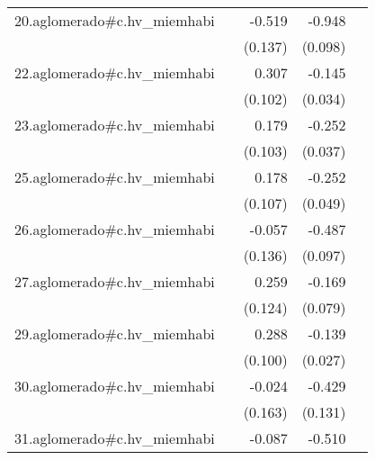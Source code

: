 {\begin{longtable}{l*{4}{D{.}{.}{-1}}}
\addlinespace
20.aglomerado#c.hv\_miemhabi&                     &      -0.519\sym{***}&      -0.948\sym{***}&                     \\
            &                     &     (0.137)         &     (0.098)         &                     \\
\addlinespace
22.aglomerado#c.hv\_miemhabi&                     &       0.307\sym{**} &      -0.145\sym{***}&                     \\
            &                     &     (0.102)         &     (0.034)         &                     \\
\addlinespace
23.aglomerado#c.hv\_miemhabi&                     &       0.179         &      -0.252\sym{***}&                     \\
            &                     &     (0.103)         &     (0.037)         &                     \\
\addlinespace
25.aglomerado#c.hv\_miemhabi&                     &       0.178         &      -0.252\sym{***}&                     \\
            &                     &     (0.107)         &     (0.049)         &                     \\
\addlinespace
26.aglomerado#c.hv\_miemhabi&                     &      -0.057         &      -0.487\sym{***}&                     \\
            &                     &     (0.136)         &     (0.097)         &                     \\
\addlinespace
27.aglomerado#c.hv\_miemhabi&                     &       0.259\sym{*}  &      -0.169\sym{*}  &                     \\
            &                     &     (0.124)         &     (0.079)         &                     \\
\addlinespace
29.aglomerado#c.hv\_miemhabi&                     &       0.288\sym{**} &      -0.139\sym{***}&                     \\
            &                     &     (0.100)         &     (0.027)         &                     \\
\addlinespace
30.aglomerado#c.hv\_miemhabi&                     &      -0.024         &      -0.429\sym{**} &                     \\
            &                     &     (0.163)         &     (0.131)         &                     \\
\addlinespace
31.aglomerado#c.hv\_miemhabi&                     &      -0.087         &      -0.510\sym{***}&                     \\

\end{longtable}}
